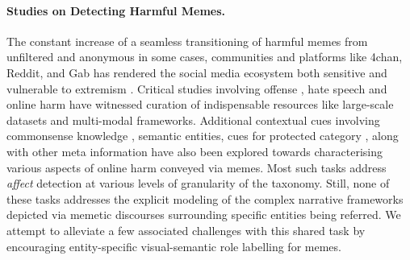 \documentclass[11pt]{article}
\begin{document}
\paragraph{\bf Studies on Detecting Harmful Memes.}
The constant increase of a seamless transitioning of harmful memes from unfiltered and anonymous in some cases, communities and platforms like 4chan, Reddit, and Gab has rendered the social media ecosystem both sensitive and vulnerable to extremism \cite{Zannettou2018}. 
Critical studies involving offense \cite{suryawanshi-etal-2020-multimodal}, hate speech \cite{kiela2020hateful,gomez2019exploring} and online harm \cite{pramanick-etal-2021-momenta-multimodal} have witnessed curation of indispensable resources like large-scale datasets and multi-modal frameworks. 
Additional contextual cues involving commonsense knowledge \cite{9582340}, semantic entities, cues for protected category \cite{pramanick-etal-2021-momenta-multimodal,karkkainen2019fairface}, along with other meta information have also been explored towards characterising various aspects of online harm conveyed via memes. 
Most such tasks address \textit{affect} detection at various levels of granularity of the taxonomy. Still, none of these tasks addresses the explicit modeling of the complex narrative frameworks depicted via memetic discourses surrounding specific entities being referred. We attempt to alleviate a few associated challenges with this shared task by encouraging entity-specific visual-semantic role labelling for memes.
\end{document}
